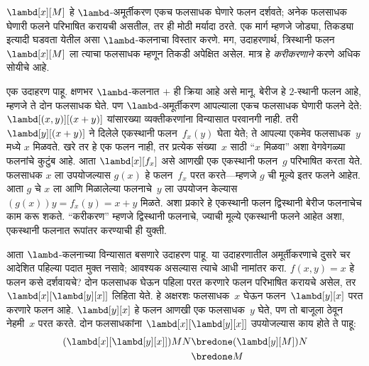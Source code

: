 \documentclass[../../../include/open-logic-section]{subfiles}
\begin{document}

$\lambd[x][M]$ हे $\lambd$-अमूर्तीकरण एकच फलसाधक घेणारे
फलन दर्शवते; अनेक फलसाधक घेणारी फलने परिभाषित करायची असतील,
तर ही मोठी मर्यादा ठरते. एक मार्ग म्हणजे जोड्या, तिकड्या इत्यादी
घडवता येतील असा $\lambd$-कलनाचा विस्तार करणे. मग, उदाहरणार्थ,
त्रिस्थानी फलन $\lambd[x][M]$ ला त्याचा फलसाधक म्हणून
तिकडी अपेक्षित असेल. मात्र हे \emph{करीकरणाने} करणे अधिक सोयीचे आहे.

एक उदाहरण पाहू. क्षणभर $\lambd$-कलनात $+$ ही क्रिया आहे
असे मानू. बेरीज हे $2$-स्थानी फलन आहे, म्हणजे ते दोन फलसाधक
घेते. पण $\lambd$-अमूर्तीकरण आपल्याला एकच फलसाधक घेणारी फलने
देते: $\lambd[(x,y)][(x+y)]$ यांसारख्या व्यक्तीकरणांना विन्यासात
परवानगी नाही. तरी $\lambd[y][(x+y)]$ ने दिलेले एकस्थानी
फलन~$f_x(y)$ घेता येते; ते आपल्या एकमेव फलसाधक~$y$ मध्ये
$x$ मिळवते. खरे तर हे एक फलन नाही, तर प्रत्येक संख्या~$x$
साठी “$x$ मिळवा” अशा वेगवेगळ्या फलनांचे कुटुंब आहे. आता
$\lambd[x][f_x]$ असे आणखी एक एकस्थानी फलन~$g$ परिभाषित
करता येते. फलसाधक $x$ ला उपयोजल्यास $g(x)$ हे
फलन~$f_x$ परत करते---म्हणजे $g$ ची मूल्ये इतर फलने आहेत.
आता $g$ चे $x$ ला आणि मिळालेल्या फलनाचे~$y$ ला उपयोजन
केल्यास $(g(x))y = f_x(y) = x+y$ मिळते. अशा प्रकारे हे एकस्थानी फलन द्विस्थानी बेरीज फलनाचेच काम करू शकते.
“करीकरण” म्हणजे द्विस्थानी फलनाचे, ज्याची मूल्ये एकस्थानी
फलने आहेत अशा, एकस्थानी फलनात रूपांतर करण्याची ही युक्ती.

आता $\lambd$-कलनाच्या विन्यासात बसणारे उदाहरण पाहू.
या उदाहरणातील अमूर्तीकरणाचे दुसरे चर आदेशित पहिल्या पदात
मुक्त नसावे; आवश्यक असल्यास त्याचे आधी नामांतर करा.
$f(x,y) = x$ हे फलन कसे दर्शवायचे? दोन फलसाधक घेऊन
पहिला परत करणारे फलन परिभाषित करायचे असेल, तर
$\lambd[x][\lambd[y][x]]$ लिहिता येते. हे अक्षरशः
फलसाधक~$x$ घेऊन फलन~$\lambd[y][x]$ परत करणारे फलन आहे.
$\lambd[y][x]$ हे फलन आणखी एक फलसाधक~$y$ घेते,
पण तो बाजूला ठेवून नेहमी~$x$ परत करते. दोन फलसाधकांना
$\lambd[x][\lambd[y][x]]$ उपयोजल्यास काय होते ते पाहू:
\begin{align*}
  (\lambd[x][\lambd[y][x]])MN
  \bredone & (\lambd[y][M])N \\
  \bredone & M
\end{align*}
\end{document}
